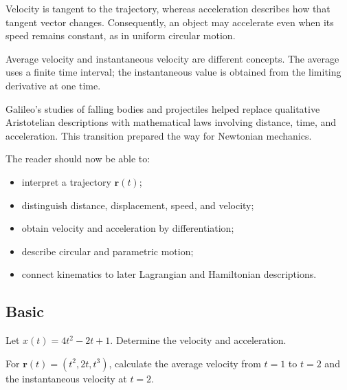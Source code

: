 \begin{physical}
Velocity is tangent to the trajectory, whereas acceleration describes how that
tangent vector changes. Consequently, an object may accelerate even when its
speed remains constant, as in uniform circular motion.
\end{physical}

\begin{warningbox}
Average velocity and instantaneous velocity are different concepts.
The average uses a finite time interval; the instantaneous value is obtained
from the limiting derivative at one time.
\end{warningbox}

\begin{chapterhistorical}
Galileo's studies of falling bodies and projectiles helped replace qualitative
Aristotelian descriptions with mathematical laws involving distance, time, and
acceleration. This transition prepared the way for Newtonian mechanics.
\end{chapterhistorical}

\chapteroutcomesheading
\begin{outcomesbox}
The reader should now be able to:
\begin{itemize}
\item interpret a trajectory $\mathbf r(t)$;
\item distinguish distance, displacement, speed, and velocity;
\item obtain velocity and acceleration by differentiation;
\item describe circular and parametric motion;
\item connect kinematics to later Lagrangian and Hamiltonian descriptions.
\end{itemize}
\end{outcomesbox}

\chapterexercisesheading
\subsection*{Basic}
\begin{chapterexercise}
Let $x(t)=4t^2-2t+1$. Determine the velocity and acceleration.
\end{chapterexercise}

\begin{chapterexercise}
For $\mathbf r(t)=(t^2,2t,t^3)$, calculate the average velocity from
$t=1$ to $t=2$ and the instantaneous velocity at $t=2$.
\end{chapterexercise}

